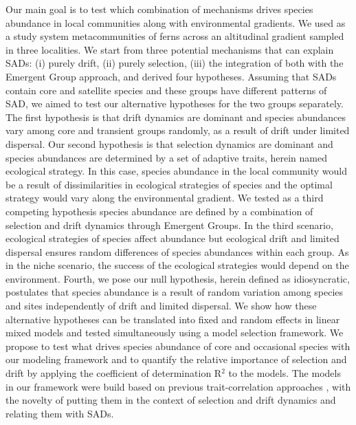 \documentclass[12pt]{article}
\begin{document}
Our main goal is to test which combination of mechanisms drives species abundance in local communities along with environmental gradients. We used as a study system metacommunities of ferns across an altitudinal gradient sampled in three localities. 
We start from three potential mechanisms that can explain SADs: (i) purely drift,  (ii) purely selection, (iii) the integration of both with the Emergent Group approach, and derived four hypotheses. %
Assuming
that SADs contain core and satellite species and these groups %
have %
different patterns of SAD, we aimed to test our
alternative %
hypotheses for the two groups separately. 
The first hypothesis is that drift dynamics are dominant and species abundances vary among core and transient groups
randomly, as a result of drift under limited dispersal.
Our second hypothesis is that selection dynamics are dominant and species abundances are determined by a set of adaptive traits, herein named ecological strategy. 
In this case, species abundance in the local community would be a result of dissimilarities in ecological strategies of species and the optimal strategy would vary along the environmental gradient. 
We tested as a third competing hypothesis %
species abundance are defined by a combination of selection and drift dynamics through Emergent Groups. In the third scenario, ecological strategies of species affect abundance but ecological drift and limited dispersal ensures random differences of species abundances within each group. As in the niche scenario, the success of the ecological strategies would depend on the environment.
Fourth,
we pose %
our null hypothesis, herein defined as idiosyncratic, postulates that species abundance is a result of random variation among species and sites independently of drift and limited dispersal.
We show how these
alternative %
hypotheses can be translated into fixed and random effects in linear mixed models and tested simultaneously using a model selection framework.
We propose to test what drives species abundance of core and occasional species with our modeling framework and to quantify the relative importance of selection and drift by applying the coefficient of determination R{$^2$} \citep{Nakagawa2013, Nakagawa2017} to the models. The models in our framework were build based on previous trait-correlation approaches \citep{Pollock2012, Jamil2013, Jamil2013a, Miller2019, TerBraak2019}, with the novelty of putting them in the context of selection and drift dynamics and relating them with SADs.
\end{document}

